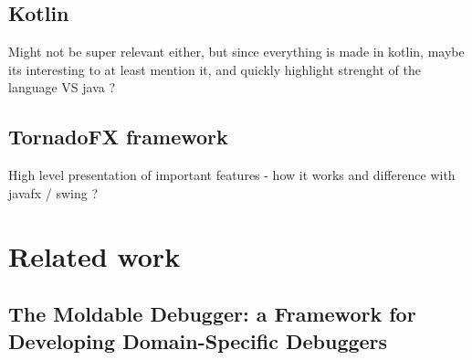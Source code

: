 	\section{Kotlin}
	Might not be super relevant either, but since everything is made in kotlin,	maybe its interesting to at least mention it, and quickly highlight strenght of the language VS java ?

	\section{TornadoFX framework}
	High level presentation of important features - how it works and difference with javafx / swing ?

\chapter{Related work}






\section{The Moldable Debugger: a Framework for Developing Domain-Specific Debuggers}

